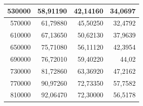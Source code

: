 \documentclass[a4paper, 12pt]{article}
\begin{document}
\begin{longtable}[c]{@{}rrrr@{}}
		\multicolumn{1}{|r|}{530000}                  & \multicolumn{1}{r|}{58,91190}               & \multicolumn{1}{r|}{42,14160}                                                          & \multicolumn{1}{r|}{34,0697}                                                           \\* \midrule
		\multicolumn{1}{|r|}{570000}                  & \multicolumn{1}{r|}{61,79880}               & \multicolumn{1}{r|}{45,50250}                                                          & \multicolumn{1}{r|}{32,4792}                                                           \\* \midrule
		\multicolumn{1}{|r|}{610000}                  & \multicolumn{1}{r|}{67,13650}               & \multicolumn{1}{r|}{50,62130}                                                          & \multicolumn{1}{r|}{37,9639}                                                           \\* \midrule
		\multicolumn{1}{|r|}{650000}                  & \multicolumn{1}{r|}{75,71080}               & \multicolumn{1}{r|}{56,11120}                                                          & \multicolumn{1}{r|}{42,3954}                                                           \\* \midrule
		\multicolumn{1}{|r|}{690000}                  & \multicolumn{1}{r|}{76,72010}               & \multicolumn{1}{r|}{59,40220}                                                          & \multicolumn{1}{r|}{44,02}                                                             \\* \midrule
		\multicolumn{1}{|r|}{730000}                  & \multicolumn{1}{r|}{81,72860}               & \multicolumn{1}{r|}{63,36920}                                                          & \multicolumn{1}{r|}{47,2162}                                                           \\* \midrule
		\multicolumn{1}{|r|}{770000}                  & \multicolumn{1}{r|}{90,97260}               & \multicolumn{1}{r|}{72,73350}                                                          & \multicolumn{1}{r|}{57,7582}                                                           \\* \midrule
		\multicolumn{1}{|r|}{810000}                  & \multicolumn{1}{r|}{92,06470}               & \multicolumn{1}{r|}{72,30000}                                                          & \multicolumn{1}{r|}{56,5178}                                                           \\* \midrule

\end{longtable}
\end{document}
